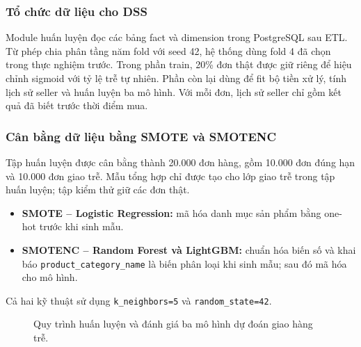 \documentclass[a4paper]{article}
\begin{document}
\subsubsection{Tổ chức dữ liệu cho DSS}
Module huấn luyện đọc các bảng fact và dimension trong PostgreSQL sau ETL. Từ phép chia phân tầng năm fold với seed 42, hệ thống dùng fold 4 đã chọn trong thực nghiệm trước. Trong phần train, 20\% đơn thật được giữ riêng để hiệu chỉnh sigmoid với tỷ lệ trễ tự nhiên. Phần còn lại dùng để fit bộ tiền xử lý, tính lịch sử seller và huấn luyện ba mô hình. Với mỗi đơn, lịch sử seller chỉ gồm kết quả đã biết trước thời điểm mua.

\subsubsection{Cân bằng dữ liệu bằng SMOTE và SMOTENC}
Tập huấn luyện được cân bằng thành 20.000 đơn hàng, gồm 10.000 đơn đúng hạn và 10.000 đơn giao trễ. Mẫu tổng hợp chỉ được tạo cho lớp giao trễ trong tập huấn luyện; tập kiểm thử giữ các đơn thật.
\begin{itemize}
    \item \textbf{SMOTE -- Logistic Regression:} mã hóa danh mục sản phẩm bằng one-hot trước khi sinh mẫu.
    \item \textbf{SMOTENC -- Random Forest và LightGBM:} chuẩn hóa biến số và khai báo \texttt{product\_category\_name} là biến phân loại khi sinh mẫu; sau đó mã hóa cho mô hình.
\end{itemize}
Cả hai kỹ thuật sử dụng \texttt{k\_neighbors=5} và \texttt{random\_state=42}.

\begin{figure}[H]
\centering
{}
\caption{Quy trình huấn luyện và đánh giá ba mô hình dự đoán giao hàng trễ.}
\label{fig:late-process}
\end{figure}
\end{document}
